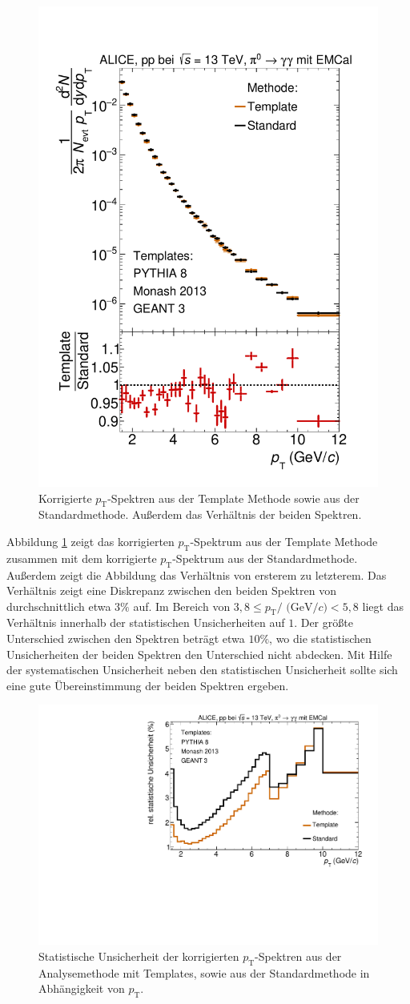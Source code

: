 \begin{figure}[t!]
\centering
\includegraphics[width=.65\linewidth]{KorrigierteYields_Data_2016.pdf}
\caption{Korrigierte $p_\text{T}$-Spektren aus der Template Methode sowie aus der Standardmethode.
Außerdem das Verhältnis der beiden Spektren.}
\label{fig:KorrYieldComp}
\end{figure}
Abbildung \ref{fig:KorrYieldComp} zeigt das korrigierten $p_\text{T}$-Spektrum aus der Template Methode zusammen mit dem korrigierte $p_\text{T}$-Spektrum aus der Standardmethode.
Außerdem zeigt die Abbildung das Verhältnis von ersterem zu letzterem.
Das Verhältnis zeigt eine Diskrepanz zwischen den beiden Spektren von durchschnittlich etwa $3\%$ auf.
Im Bereich von $3,8 \leq p_\text{T}/\text{ (GeV}/c) < 5,8$ liegt das Verhältnis innerhalb der statistischen Unsicherheiten auf $1$.
Der größte Unterschied zwischen den Spektren beträgt etwa $10\%$, wo die statistischen Unsicherheiten der beiden Spektren den Unterschied nicht abdecken.
Mit Hilfe der systematischen Unsicherheit neben den statistischen Unsicherheit sollte sich eine gute Übereinstimmung der beiden Spektren ergeben.
\begin{figure}[t!]
\centering
\includegraphics[width=.65\linewidth]{StatistischeUnsicherheitVergleich_Data_2016.pdf}
\caption{Statistische Unsicherheit der korrigierten $p_\text{T}$-Spektren aus der Analysemethode mit Templates, sowie aus der Standardmethode in Abhängigkeit von $p_\text{T}$.}
\label{fig:StatUncer}
\end{figure}
